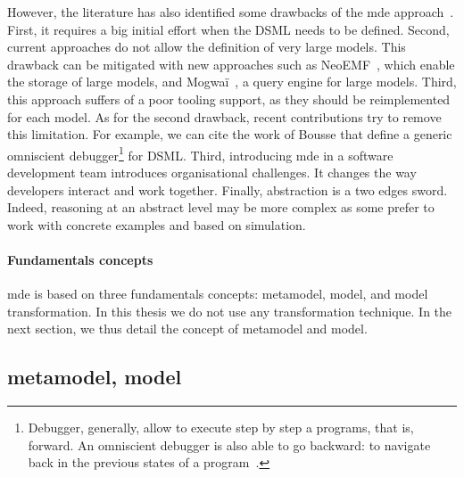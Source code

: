 However, the literature has also identified some drawbacks of the \gls{mde} approach~\cite{DBLP:conf/ifm/Kent02, DBLP:conf/uml/BakerLW05, DBLP:conf/models/WhittleHRBH13, DBLP:conf/icse/HutchinsonRW11}.
First, it requires a big initial effort when the DSML needs to be defined.
Second, current approaches do not allow the definition of very large \glspl{model}.
This drawback can be mitigated with new approaches such as NeoEMF~\cite{DBLP:conf/ecmdafa/BenelallamGSTL14, DBLP:journals/scp/DanielSBTVGC17}, which enable the storage of large \glspl{model},  and Mogwaï~\cite{DBLP:conf/rcis/DanielSC16}, a query engine for large \glspl{model}.
Third, this approach suffers of a poor tooling support, as they should be reimplemented for each \gls{model}.
As for the second drawback, recent contributions try to remove this limitation.
For example, we can cite the work of Bousse \etal \cite{DBLP:journals/jss/BousseLCWB18} that define a generic omniscient debugger\footnote{Debugger, generally, allow to execute step by step a programs, that is, forward. An omniscient debugger is also able to go backward: to navigate back in the previous states of a program~\cite{DBLP:journals/corr/cs-SE-0310016}.} for DSML.
Third, introducing \gls{mde} in a software development team introduces organisational challenges.
It changes the way developers interact and work together.
Finally, abstraction is a two edges sword.
Indeed, reasoning at an abstract level may be more complex as some prefer to work with concrete examples and based on simulation.

\paragraph{Fundamentals concepts}
\gls{mde} is based on three fundamentals concepts: \gls{metamodel}, \gls{model}, and model transformation.
In this thesis we do not use any transformation technique.
In the next section, we thus detail the concept of \gls{metamodel} and \gls{model}.

\subsection[Metamodel, model]{\Gls{metamodel}, \gls{model}}

